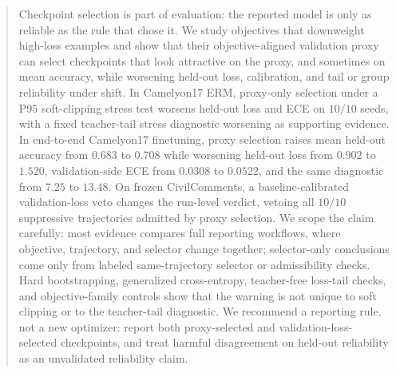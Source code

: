 \begin{abstract}
Checkpoint selection is part of evaluation: the reported model is only as reliable as the rule that chose it. We study objectives that downweight high-loss examples and show that their objective-aligned validation proxy can select checkpoints that look attractive on the proxy, and sometimes on mean accuracy, while worsening held-out loss, calibration, and tail or group reliability under shift. In Camelyon17 ERM, proxy-only selection under a P95 soft-clipping stress test worsens held-out loss and ECE on $10/10$ seeds, with a fixed teacher-tail stress diagnostic worsening as supporting evidence. In end-to-end Camelyon17 finetuning, proxy selection raises mean held-out accuracy from $0.683$ to $0.708$ while worsening held-out loss from $0.902$ to $1.520$, validation-side ECE from $0.0308$ to $0.0522$, and the same diagnostic from $7.25$ to $13.48$. On frozen CivilComments, a baseline-calibrated validation-loss veto changes the run-level verdict, vetoing all $10/10$ suppressive trajectories admitted by proxy selection. We scope the claim carefully: most evidence compares full reporting workflows, where objective, trajectory, and selector change together; selector-only conclusions come only from labeled same-trajectory selector or admissibility checks. Hard bootstrapping, generalized cross-entropy, teacher-free loss-tail checks, and objective-family controls show that the warning is not unique to soft clipping or to the teacher-tail diagnostic. We recommend a reporting rule, not a new optimizer: report both proxy-selected and validation-loss-selected checkpoints, and treat harmful disagreement on held-out reliability as an unvalidated reliability claim.
\end{abstract}
